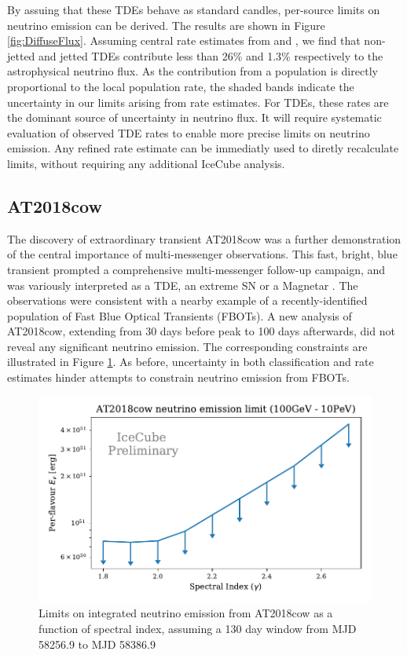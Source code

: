 \documentclass{PoS}
\begin{document}
By assuing that these TDEs behave as standard candles, per-source limits on neutrino emission can be derived.  The results are shown in Figure \ref{fig:DiffuseFlux}. Assuming central rate estimates from \cite{vanVelzen:2017qum} and \cite{Sun:2015bda}, we find that non-jetted and jetted TDEs contribute less than 26\% and 1.3\% respectively to the astrophysical neutrino flux. As the contribution from a population is directly proportional to the local population rate, the shaded bands indicate the uncertainty in our limits arising from rate estimates. For TDEs, these rates are the dominant source of uncertainty in neutrino flux. It will require systematic evaluation of observed TDE rates to enable more precise limits on neutrino emission. Any refined rate estimate can be immediatly used to diretly recalculate  limits, without requiring any additional IceCube analysis.

\subsection{AT2018cow}

The discovery of extraordinary transient AT2018cow was a further demonstration of the central importance of multi-messenger observations.  This fast, bright, blue transient prompted a comprehensive multi-messenger follow-up campaign, and was variously interpreted as a TDE, an extreme SN or a Magnetar \cite{Perley:2018oky}. The observations were consistent with a nearby example of a recently-identified population of Fast Blue Optical Transients (FBOTs). A new analysis of AT2018cow, extending from 30 days before peak to 100 days afterwards, did not reveal any significant neutrino emission. The corresponding constraints are illustrated in Figure \ref{fig:At2018cow}. As before, uncertainty in both classification and rate estimates hinder attempts to constrain neutrino emission from FBOTs.

\begin{figure}[!ht]
	\centering \includegraphics[width=.9\textwidth]{figures/AT2018cow_limit_plot}
	\caption{Limits on integrated neutrino emission from AT2018cow as a function of spectral index, assuming a 130 day window from MJD 58256.9 to MJD 58386.9}
	\label{fig:At2018cow}
\end{figure}
\end{document}
